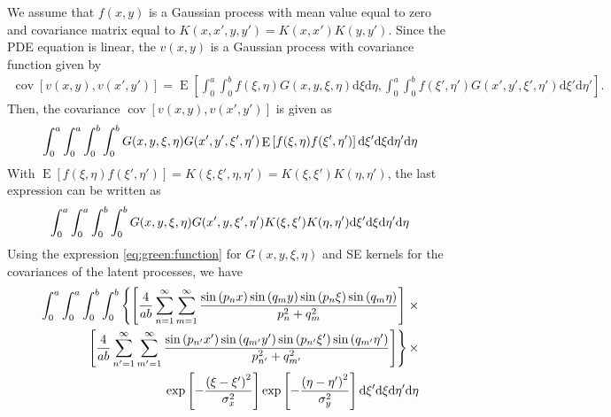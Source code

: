 \documentclass[a4paper,10pt]{article}
\newcommand{\dif}{\textrm{d}}
\DeclareMathOperator{\cov}{cov} \DeclareMathOperator{\ex}{E}
\begin{document}
We assume that $f(x,y)$ is a Gaussian process with
mean value equal to zero and covariance matrix equal to
$K(x,x',y,y')=K(x,x')K(y,y')$. Since the PDE equation is
linear, the $v(x,y)$ is a Gaussian process with covariance function
given by
\begin{align}
\cov\left[v(x,y),v(x',y')\right]=\ex\left[\int_0^a\int_0^bf(\xi,\eta)G(x,y, \xi,\eta)\dif\xi\dif\eta,
\int_0^{a}\int_0^bf(\xi',\eta')G(x',y', \xi',\eta')\dif\xi'\dif\eta'\right].
\end{align}
Then, the covariance $\cov\left[v(x,y), v(x',y')\right]$ is given
as
\begin{align}\notag
\int_0^a\int_0^{a}\int_0^b\int_0^bG(x,y, \xi,\eta)G(x',y',\xi',\eta')\ex\left[f(\xi,\eta)f(\xi',\eta')\right]
\dif\xi'\dif\xi\dif\eta'\dif\eta
\end{align}
With
$\ex\left[f(\xi,\eta)f(\xi',\eta')\right]=K(\xi,\xi',\eta,\eta')=K(\xi,\xi')K(\eta,\eta')$,
the last expression can be written as
\begin{align}\notag
\int_0^a\int_0^{a}\int_0^b\int_0^bG(x,y, \xi,\eta)G(x',
  y, \xi',\eta')K(\xi,\xi')K(\eta,\eta')
\dif\xi'\dif\xi\dif\eta'\dif\eta
\end{align}
Using the expression \eqref{eq:green:function} for $G(x,y, \xi,\eta)$ and SE kernels for the
covariances of the latent processes, we have
\begin{align}\notag
\int_0^a\int_0^{a}\int_0^b\int_0^b\left\{\left[
\frac{4}{ab}\sum_{n=1}^\infty
                  \sum_{m=1}^\infty\frac{\sin\left({p_n x}\right)
\sin\left(q_m y\right)\sin\left(p_n \xi\right)\sin\left(q_m \eta\right)}{p_n^2 + q_m^2}
\right]\right.\times\\\notag
\left.\left[
\frac{4}{ab}\sum_{n'=1}^\infty
                  \sum_{m'=1}^\infty\frac{\sin\left({p_{n'} x'}\right)
\sin\left(q_{m'} y'\right)\sin\left(p_{n'} \xi'\right)\sin\left(q_{m'} \eta'\right)}{p_{n'}^2 + q_{m'}^2}
\right]\right\}\times\\\notag
\exp\left[-\frac{\left(\xi-\xi'\right)^2}{\sigma^2_x}\right]\exp\left[-\frac{\left(\eta-\eta'\right)^2}{\sigma^2_{y}}\right]\dif\xi'\dif\xi\dif\eta'\dif\eta
\end{align}
\end{document}
